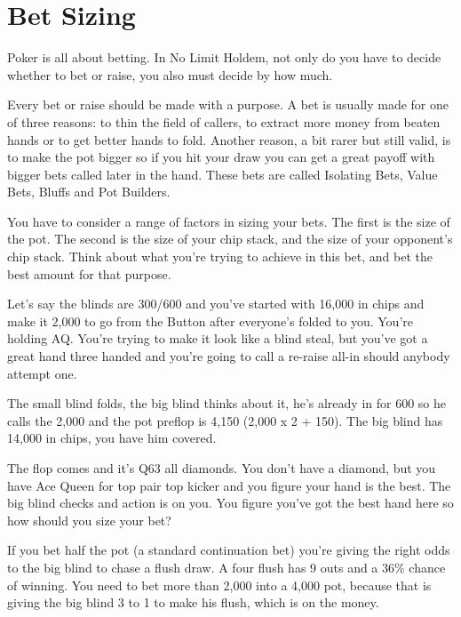 \chapter{Bet Sizing}


Poker is all about betting. In No Limit Holdem, not only do you have to
decide whether to bet or raise, you also must decide by how much.

Every bet or raise should be made with a purpose. A bet
is usually made for one of three reasons: to thin the field of callers,
to extract more money from beaten hands or to get better hands to fold.
Another reason, a bit rarer but still valid, is to make the pot bigger
so if you hit your draw you can get a great payoff with bigger bets called
later in the hand. These bets are called Isolating Bets, Value Bets,
Bluffs and Pot Builders.

You have to consider a range of factors in sizing your bets. The first is
the size of the pot. The second is the size of your chip stack, and
the size of your opponent's chip stack. Think about
what you're trying to achieve in this bet, and bet the best amount
for that purpose.


Let's say the blinds are 300/600 and you've started with 16,000 in chips
and make it 2,000 to go from the Button after everyone's folded to you.
You're holding AQ. You're trying to make it look like a blind steal, but
you've got a great hand three handed and you're going to call a re-raise
all-in should anybody attempt one.

The small blind folds, the big blind thinks about it, he's already in
for 600 so he calls the 2,000 and the pot
preflop is 4,150 (2,000 x 2 + 150). The big blind has 14,000 in chips, you
have him covered.

The flop comes and it's Q63 all diamonds. You don't have a diamond, but
you have Ace Queen for top pair top kicker and you figure your hand
is the best. The big blind checks and action is on you. You figure you've
got the best hand here so how should you size your bet?

If you bet half the pot (a standard continuation bet) you're giving the
right odds to the big blind to chase a flush draw. A four flush has 9 outs
and a 36\% chance of winning. You need to bet more than 2,000 into a 4,000 pot,
because that is giving the big blind 3 to 1 to make his flush, which is
on the money.

